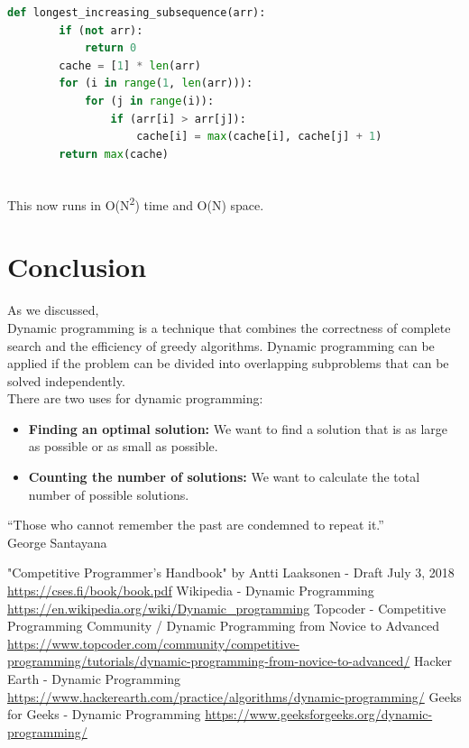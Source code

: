 \documentclass[12pt]{article}
\begin{document}
    
    \begin{lstlisting}[language=Python]
	def longest_increasing_subsequence(arr):
        if (not arr):
            return 0
        cache = [1] * len(arr)
        for (i in range(1, len(arr))):
            for (j in range(i)):
                if (arr[i] > arr[j]):
                    cache[i] = max(cache[i], cache[j] + 1)
        return max(cache)
        
    \end{lstlisting}
    
    This now runs in O(N\textsuperscript{2}) time and O(N) space.
	\newpage
	\section{Conclusion}
	As we discussed,\\
	Dynamic programming is a technique that combines the correctness of complete search and the efficiency of greedy algorithms. Dynamic programming can be applied if the problem can be divided into overlapping subproblems that can be solved independently.\\
	There are two uses for dynamic programming:
	\begin{itemize}
	    \item \textbf{Finding an optimal solution:} We want to find a solution that is as large
as possible or as small as possible.
        \item \textbf{Counting the number of solutions:} We want to calculate the total number of possible solutions.
	\end{itemize}
	\vfill
	
	\begin{center}
	    “Those who cannot remember the past are condemned to repeat it.” \\ George Santayana
	\end{center}
	
	\newpage
	\begin{thebibliography}{0}
		
		"Competitive Programmer’s Handbook" by Antti Laaksonen - Draft July 3, 2018 \url{https://cses.fi/book/book.pdf}
		Wikipedia - Dynamic Programming
		\url{https://en.wikipedia.org/wiki/Dynamic_programming}
		Topcoder - Competitive Programming Community / Dynamic Programming from Novice to Advanced
		\url{https://www.topcoder.com/community/competitive-programming/tutorials/dynamic-programming-from-novice-to-advanced/}
		Hacker Earth - Dynamic Programming
		\url{https://www.hackerearth.com/practice/algorithms/dynamic-programming/}
		Geeks for Geeks - Dynamic Programming \url{https://www.geeksforgeeks.org/dynamic-programming/}
	\end{thebibliography}
\end{document}
